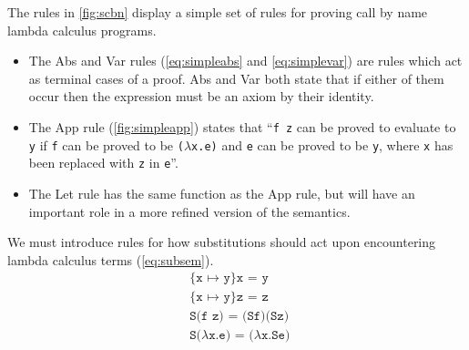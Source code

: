 \documentclass[11pt,oneside,a4paper]{report}
\begin{document}
The rules in \autoref{fig:scbn} display a simple set of rules for proving call by name lambda calculus programs.
\begin{itemize}
\item The Abs and Var rules (\autoref{eq:simpleabs} and \autoref{eq:simplevar}) are rules which act as terminal cases of a proof.
      Abs and Var both state that if either of them occur then the expression must be an axiom by their identity.
\item The App rule (\autoref{fig:simpleapp}) states that ``\texttt{f z} can be proved to evaluate to \texttt{y} if \texttt{f} can be proved to be \texttt{($\lambda$x.e)} and \texttt{e} can be proved to be \texttt{y}, where \texttt{x} has been replaced with \texttt{z} in \texttt{e}''.
\item The Let rule has the same function as the App rule, but will have an important role in a more refined version of the semantics.
\end{itemize}
We must introduce rules for how substitutions should act upon encountering lambda calculus terms (\autoref{eq:subsem}).
\begin{align}
  &\texttt{\{x $\mapsto$ y\}x = y} \label{eq:subsem}\\
  &\texttt{\{x $\mapsto$ y\}z = z}  \tag*{}\\
  &\texttt{S(f z) = (Sf)(Sz)} \tag*{}\\
  &\texttt{S($\lambda$x.e) = ($\lambda$x.Se) } \label{eq:subsemrem}%
\end{align}
\end{document}
